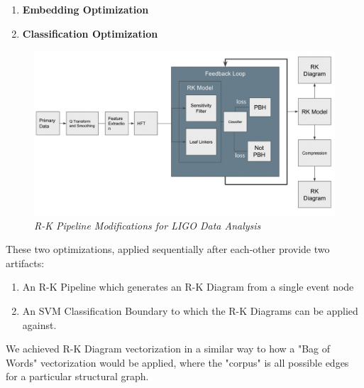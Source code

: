 \begin{enumerate}
    \item \textbf{Embedding Optimization}
    \item \textbf{Classification Optimization}
\end{enumerate}

    \begin{figure}[H]
        \centering
        \includegraphics[width=1.0\linewidth]{images/ligo_pipeline.jpg}
        \caption{\textit{R-K Pipeline Modifications for LIGO Data Analysis}}
        \label{fig:ligo_pipeline_fig}
    \end{figure}

    These two optimizations, applied sequentially after each-other provide two artifacts:
    
\begin{enumerate}
    \item An R-K Pipeline which generates an R-K Diagram from a single event node
    \item An SVM Classification Boundary to which the R-K Diagrams can be applied against.
\end{enumerate}

    We achieved R-K Diagram vectorization in a similar way to how a "Bag of Words" vectorization would be applied, where the "corpus" is all possible edges for a particular structural graph.

